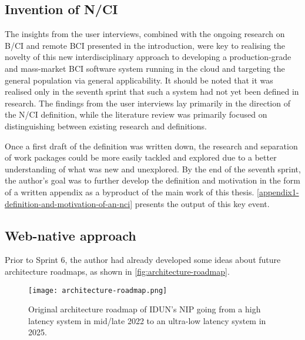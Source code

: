 \subsection{Invention of N/CI}
\label{chapter4-invention-of-nci}

The insights from the user interviews, combined with the ongoing research on B/CI and remote BCI presented in the introduction, were key to realising the novelty of this new interdisciplinary approach to developing a production-grade and mass-market BCI software system running in the cloud and targeting the general population via general applicability. It should be noted that it was realised only in the seventh sprint that such a system had not yet been defined in research. The findings from the user interviews lay primarily in the direction of the N/CI definition, while the literature review was primarily focused on distinguishing between existing research and definitions.

Once a first draft of the definition was written down, the research and separation of work packages could be more easily tackled and explored due to a better understanding of what was new and unexplored. By the end of the seventh sprint, the author’s goal was to further develop the definition and motivation in the form of a written appendix as a byproduct of the main work of this thesis. \autoref{appendix1-definition-and-motivation-of-an-nci} presents the output of this key event.

\subsection{Web-native approach}
\label{chapter4-web-native-approach}

Prior to Sprint 6, the author had already developed some ideas about future architecture roadmaps, as shown in \autoref{fig:architecture-roadmap}.

\begin{figure}[!ht]
  \centering
  \texttt{[image: architecture-roadmap.png]}
  \caption{Original architecture roadmap of IDUN’s NIP going from a high latency system in mid/late 2022 to an ultra-low latency system in 2025.}
  \label{fig:architecture-roadmap}
\end{figure}

